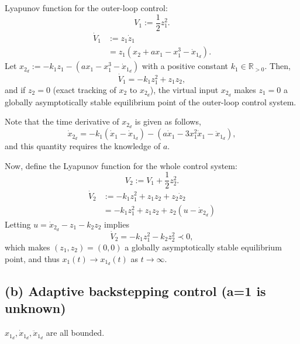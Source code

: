\documentclass{article}
\begin{document}
Lyapunov function for the outer-loop control:
\begin{equation}
  V_{1} := \frac{1}{2} z_{1}^{2}.
\end{equation}
\begin{align}
  \dot{V}_{1} &:= z_{1} \dot{z}_{1}
  \\
              &= z_{1} (x_{2} + a x_{1} - x_{1}^{3} - \dot{x}_{1_{d}}).
\end{align}
Let $x_{2_{d}} := -k_{1} z_{1} -(a x_{1}-x_{1}^{3} - \dot{x}_{1_{d}})$ with a positive constant $k_{1} \in \mathbb{R}_{>0}$.
Then,
\begin{equation}
  \dot{V}_{1} = -k_{1} z_{1}^{2} + z_{1} z_{2},
\end{equation}
and if $z_{2} = 0$ (exact tracking of $x_{2}$ to $x_{2_{d}}$), the virtual input $x_{2_{d}}$ makes $z_{1} = 0$ a globally asymptotically stable equilibrium point of the outer-loop control system.

Note that the time derivative of $x_{2_{d}}$ is given as follows,
\begin{equation}
  \dot{x}_{2_{d}} = -k_{1} (\dot{x}_{1} - \dot{x}_{1_{d}}) - (a \dot{x}_{1} - 3x_{1}^{2} \dot{x}_{1} - \ddot{x}_{1_{d}}),
\end{equation}
and this quantity requires the knowledge of $a$.

Now, define the Lyapunov function for the whole control system:
\begin{equation}
  V_{2} := V_{1} + \frac{1}{2} z_{2}^{2}.
\end{equation}
\begin{align}
  \dot{V}_{2} &:= -k_{1} z_{1}^{2} + z_{1} z_{2} + z_{2} \dot{z}_{2}
  \\
              &= -k_{1} z_{1}^{2} + z_{1} z_{2} + z_{2} (u - \dot{x}_{2_{d}})
\end{align}
Letting $u = \dot{x}_{2_{d}} - z_{1} - k_{2} z_{2}$ implies
\begin{equation}
  \dot{V}_{2} = -k_{1} z_{1}^{2} - k_{2} z_{2}^{2} \prec 0,
\end{equation}
which makes $(z_{1}, z_{2}) = (0, 0)$ a globally asymptotically stable equilibrium point,
and thus $x_{1}(t) \to x_{1_{d}} (t)$ as $t \to \infty$.

\subsection{(b) Adaptive backstepping control (a=1 is unknown)}
\begin{assumption}
  $x_{1_{d}}, \dot{x}_{1_{d}}, \ddot{x}_{1_{d}}$ are all bounded.
\end{assumption}
\end{document}
